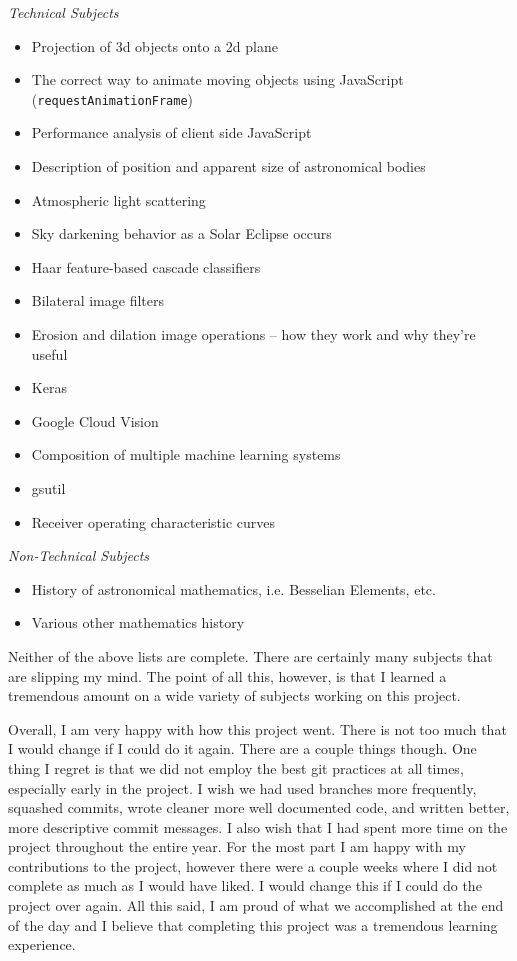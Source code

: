 \documentclass[10pt, onecolumn, draftclsnofoot, letterpaper, compsoc]{IEEEtran}
\begin{document}
\noindent \textit{Technical Subjects}
\begin{itemize}
	\item Projection of 3d objects onto a 2d plane
	\item The correct way to animate moving objects using JavaScript (\texttt{requestAnimationFrame})
	\item Performance analysis of client side JavaScript
	\item Description of position and apparent size of astronomical bodies
	\item Atmospheric light scattering
	\item Sky darkening behavior as a Solar Eclipse occurs
	\item Haar feature-based cascade classifiers
	\item Bilateral image filters
	\item Erosion and dilation image operations -- how they work and why they're useful
	\item Keras
	\item Google Cloud Vision
	\item Composition of multiple machine learning systems
	\item gsutil
	\item Receiver operating characteristic curves \\
\end{itemize}

\noindent \textit{Non-Technical Subjects}
\begin{itemize}
	\item History of astronomical mathematics, i.e. Besselian Elements, etc.
	\item Various other mathematics history \\
\end{itemize}

Neither of the above lists are complete. There are certainly many subjects that are slipping my mind.
The point of all this, however, is that I learned a tremendous amount on a wide variety of subjects
working on this project.

Overall, I am very happy with how this project went. There is not too much that I would change if I
could do it again. There are a couple things though. One thing I regret is that we did not
employ the best git practices at all times, especially early in the project. I wish we had
used branches more frequently, squashed commits, wrote cleaner more well documented code, and
written better, more descriptive commit messages. I also wish that I had spent more time on the project
throughout the entire year. For the most part I am happy with my contributions to the project,
however there were a couple weeks where I did not complete as much as I would have liked. I would change
this if I could do the project over again. All this said, I am proud of what we accomplished at
the end of the day and I believe that completing this project was a tremendous learning experience.
\end{document}
